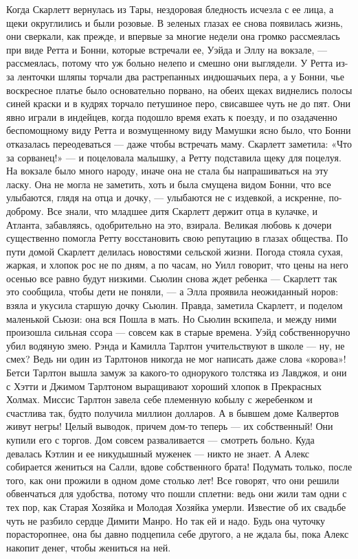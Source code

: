 Когда Скарлетт вернулась из Тары, нездоровая бледность исчезла с ее лица, а щеки округлились и были розовые. В зеленых глазах ее снова появилась жизнь, они сверкали, как прежде, и впервые за многие недели она громко рассмеялась при виде Ретта и Бонни, которые встречали ее, Уэйда и Эллу на вокзале, — рассмеялась, потому что уж больно нелепо и смешно они выглядели. У Ретта из-за ленточки шляпы торчали два растрепанных индюшачьих пера, а у Бонни, чье воскресное платье было основательно порвано, на обеих щеках виднелись полосы синей краски и в кудрях торчало петушиное перо, свисавшее чуть не до пят. Они явно играли в индейцев, когда подошло время ехать к поезду, и по озадаченно беспомощному виду Ретта и возмущенному виду Мамушки ясно было, что Бонни отказалась переодеваться — даже чтобы встречать маму.
Скарлетт заметила: «Что за сорванец!» — и поцеловала малышку, а Ретту подставила щеку для поцелуя. На вокзале было много народу, иначе она не стала бы напрашиваться на эту ласку.
Она не могла не заметить, хоть и была смущена видом Бонни, что все улыбаются, глядя на отца и дочку, — улыбаются не с издевкой, а искренне, по-доброму. Все знали, что младшее дитя Скарлетт держит отца в кулачке, и Атланта, забавляясь, одобрительно на это, взирала. Великая любовь к дочери существенно помогла Ретту восстановить свою репутацию в глазах общества.
По пути домой Скарлетт делилась новостями сельской жизни. Погода стояла сухая, жаркая, и хлопок рос не по дням, а по часам, но Уилл говорит, что цены на него осенью все равно будут низкими. Сьюлин снова ждет ребенка — Скарлетт так это сообщила, чтобы дети не поняли, — а Элла проявила неожиданный норов: взяла и укусила старшую дочку Сьюлин. Правда, заметила Скарлетт, и поделом маленькой Сьюзи: она вся Пошла в мать. Но Сьюлин вскипела, и между ними произошла сильная ссора — совсем как в старые времена. Уэйд собственноручно убил водяную змею. Рэнда и Камилла Тарлтон учительствуют в школе — ну, не смех? Ведь ни один из Тарлтонов никогда не мог написать даже слова «корова»! Бетси Тарлтон вышла замуж за какого-то однорукого толстяка из Лавджоя, и они с Хэтти и Джимом Тарлтоном выращивают хороший хлопок в Прекрасных Холмах. Миссис Тарлтон завела себе племенную кобылу с жеребенком и счастлива так, будто получила миллион долларов. А в бывшем доме Калвертов живут негры! Целый выводок, причем дом-то теперь — их собственный! Они купили его с торгов. Дом совсем разваливается — смотреть больно. Куда девалась Кэтлин и ее никудышный муженек — никто не знает. А Алекс собирается жениться на Салли, вдове собственного брата! Подумать только, после того, как они прожили в одном доме столько лет! Все говорят, что они решили обвенчаться для удобства, потому что пошли сплетни: ведь они жили там одни с тех пор, как Старая Хозяйка и Молодая Хозяйка умерли. Известие об их свадьбе чуть не разбило сердце Димити Манро. Но так ей и надо. Будь она чуточку порасторопнее, она бы давно подцепила себе другого, а не ждала бы, пока Алекс накопит денег, чтобы жениться на ней.
